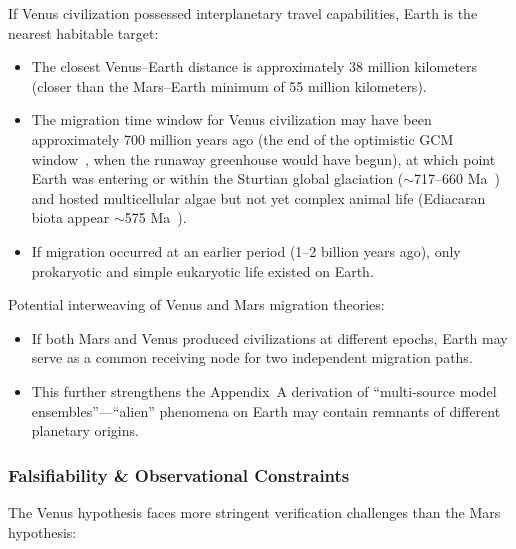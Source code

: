 \documentclass[aps,prd,twocolumn,superscriptaddress,nofootinbib]{revtex4-2}
\begin{document}
If Venus civilization possessed interplanetary travel capabilities, Earth is the nearest habitable target:

\begin{itemize}
  \item The closest Venus--Earth distance is approximately 38 million kilometers (closer than the Mars--Earth minimum of 55 million kilometers).
  \item The migration time window for Venus civilization may have been approximately 700 million years ago (the end of the optimistic GCM window~\cite{Way2020}, when the runaway greenhouse would have begun), at which point Earth was entering or within the Sturtian global glaciation (${\sim}$717--660 Ma~\cite{Rooney2015}) and hosted multicellular algae but not yet complex animal life (Ediacaran biota appear ${\sim}$575 Ma~\cite{Knoll2011}).
  \item If migration occurred at an earlier period (1--2 billion years ago), only prokaryotic and simple eukaryotic life existed on Earth.
\end{itemize}

Potential interweaving of Venus and Mars migration theories:

\begin{itemize}
  \item If both Mars and Venus produced civilizations at different epochs, Earth may serve as a common receiving node for two independent migration paths.
  \item This further strengthens the Appendix~A derivation of ``multi-source model ensembles''---``alien'' phenomena on Earth may contain remnants of different planetary origins.
\end{itemize}

\subsubsection{Falsifiability \& Observational Constraints}\label{sec:venus-falsify}

The Venus hypothesis faces more stringent verification challenges than the Mars hypothesis:
\end{document}
